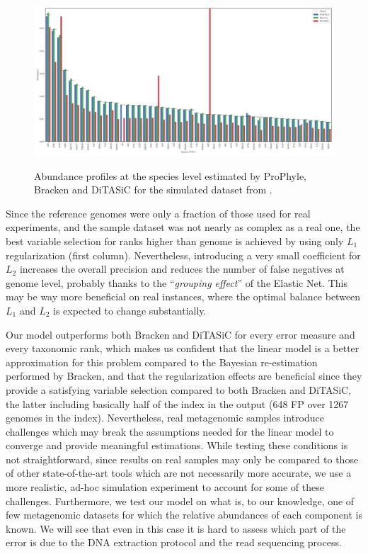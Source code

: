 \begin{figure}
  \caption{Abundance profiles at the species level estimated by ProPhyle, Bracken and DiTASiC for the simulated dataset from \cite{mende_assessment_2012}.}
  \centering
    \includegraphics[width=1\textwidth]{Figures/ab_mende.pdf}
  \label{ab_mende}
\end{figure}

Since the reference genomes were only a fraction of those used for real experiments, and the sample dataset was not nearly as complex as a real one, the best variable selection for ranks higher than genome is achieved by using only $L_1$ regularization (first column).
Nevertheless, introducing a very small coefficient for $L_2$ increases the overall precision and reduces the number of false negatives at genome level, probably thanks to the ``\textit{grouping effect}'' of the Elastic Net. This may be way more beneficial on real instances, where the optimal balance between $L_1$ and $L_2$ is expected to change substantially.

Our model outperforms both Bracken and DiTASiC for every error measure and every taxonomic rank, which makes us confident that the linear model is a better approximation for this problem compared to the Bayesian re-estimation performed by Bracken, and that the regularization effects are beneficial since they provide a satisfying variable selection compared to both Bracken and DiTASiC, the latter including basically half of the index in the output (648 FP over 1267 genomes in the index). Nevertheless, real metagenomic samples introduce challenges which may break the assumptions needed for the linear model to converge and provide meaningful estimations. While testing these conditions is not straightforward, since results on real samples may only be compared to those of other state-of-the-art tools which are not necessarily more accurate, we use a more realistic, ad-hoc simulation experiment to account for some of these challenges. Furthermore, we test our model on what is, to our knowledge, one of few metagenomic datasets for which the relative abundances of each component is known. We will see that even in this case it is hard to assess which part of the error is due to the DNA extraction protocol and the read sequencing process.

